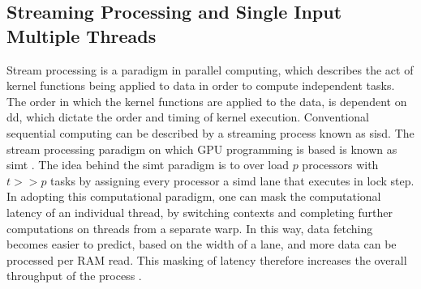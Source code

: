 \subsection{Streaming Processing and Single Input Multiple Threads}
Stream processing is a paradigm in parallel computing, which describes the act
of kernel functions being applied to data in order to compute independent tasks.
The order in which the kernel functions are applied to the data, is dependent on
\gls{dd}, which dictate the order and timing of kernel execution. Conventional
sequential computing can be described by a streaming process known as \Gls{sisd}.
The stream processing paradigm on which GPU programming is based is known as \Gls{simt}
 \cite{advancedTopics}.  The idea behind the \Gls{simt} paradigm is to over load
 $p$ processors with $t >> p$ tasks by assigning every processor a \Gls{simd} lane
 that executes in lock step.  In adopting this computational paradigm, one can mask
 the computational latency of an individual thread, by switching contexts and
 completing further computations on threads from a separate warp.  In this way,
 data fetching becomes easier to predict, based on the width of a lane, and more
 data can be processed per \Gls{RAM} read.   This masking of latency therefore increases
 the overall throughput of the process \cite{advancedtopics}.


